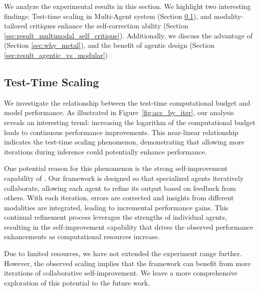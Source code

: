 We analyze the experimental results in this section. We highlight two interesting findings: Test-time scaling in Multi-Agent system (Section \ref{sec:result_test_time_scaling}), and modality-tailored critiques enhance the self-correction ability (Section \ref{sec:result_multimodal_self_critique}). Additionally, we discuss the advantage of \model{} (Section \ref{sec:why_metal}), and the benefit of agentic design (Section \ref{sec:result_agentic_vs_modular})


\subsection{Test-Time Scaling} 
\label{sec:result_test_time_scaling}

We investigate the relationship between the test-time computational budget and model performance. As illustrated in Figure~\ref{fig:acc_by_iter}, our analysis reveals an interesting trend:  increasing the logarithm of the computational budget leads to continuous performance improvements. This near-linear relationship indicates the test-time scaling phenomenon, demonstrating that allowing more iterations during inference could potentially enhance performance.

One potential reason for this phenomenon is the strong self-improvement capability of \model{}. Our framework is designed so that specialized agents iteratively collaborate, allowing each agent to refine its output based on feedback from others. With each iteration, errors are corrected and insights from different modalities are integrated, leading to incremental performance gains. This continual refinement process leverages the strengths of individual agents, resulting in the self-improvement capability that drives the observed performance enhancements as computational resources increase. 

Due to limited resources, we have not extended the experiment range further. However, the observed scaling implies that the framework can benefit from more iterations of collaborative self-improvement. We leave a more comprehensive exploration of this potential to the future work.



